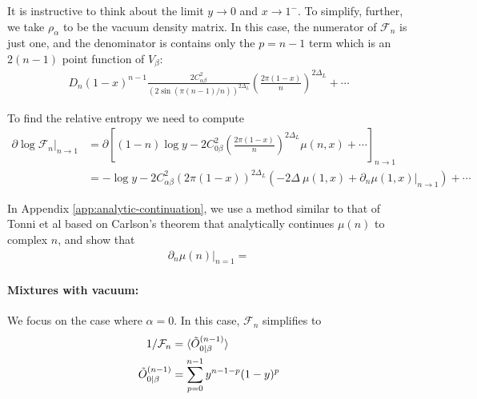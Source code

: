 \documentclass[11pt]{article}
\newcommand{\mO}{\mathcal{O}}
\newcommand{\nn}{\nonumber}
\newcommand{\lb}{\left(}
\newcommand{\rb}{\right)}
\newcommand{\NL}[1]{\textcolor{blue}{#1}}
\begin{document}
It is instructive to think about the limit $y\to 0$ and $x\to 1^-$. To simplify, further, we take $\rho_\alpha$ to be the vacuum density matrix. In this case, the numerator of $\mathcal{F}_n$ is just one, and the denominator is contains only the $p=n-1$ term which is an $2(n-1)$ point function of $V_\beta$:
\begin{align}
  D_n(1-x)^{n-1}\frac{2C_{\alpha\beta}^2}{(2\sin(\pi(n-1)/n))^{2\Delta_L}}\lb\frac{2\pi (1-x)}{n}\rb^{2\Delta_L}+\cdots 
\end{align}

To find the relative entropy we need to compute
\begin{align}
  \partial\log\mathcal{F}_n|_{n\to 1}&=\partial\left[(1-n)\log y-2C_{0\beta}^2\lb\frac{2\pi (1-x)}{n} \rb^{2\Delta_L} \mu(n,x)+\cdots \right]_{n\to 1}\nn\\
  &=-\log y-2C_{\alpha\beta}^2(2\pi (1-x))^{2\Delta_L}(-2\Delta \: \mu(1,x)+\partial_n\mu(1,x)|_{n\to 1})+\cdots
\end{align}

In Appendix \ref{app:analytic-continuation}, we use a method similar to that of Tonni et al based on Carlson's theorem that analytically continues $\mu(n)$ to complex $n$, and show that 
\begin{align}
  \partial_n\mu(n)|_{n=1}=
\end{align}


\paragraph{Mixtures with vacuum:}

We focus on the case where $\alpha=0$. In this case, $\mathcal{F}_n$ simplifies to
\begin{align}
  1/\mathcal{F}_n&=\braket{\tilde{O}_{0|\beta}^{(n-1)}}\nn\\
\tilde{O}_{0|\beta}^{(n-1)}&=\sum_{p=0}^{n-1}y^{n-1-p}(1-y)^p
\end{align}

\end{document}
